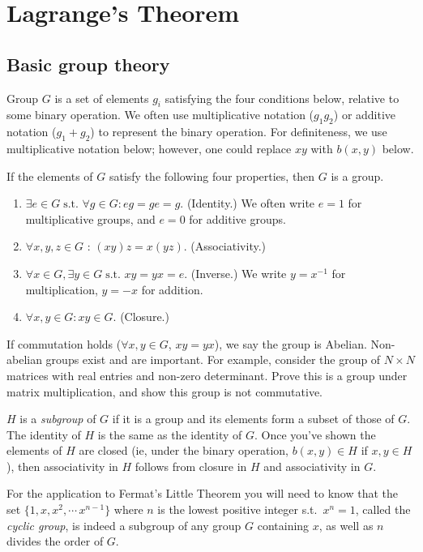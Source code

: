 \documentclass[12pt,letterpaper]{report}
\newcommand\st{\mbox{s.t.\ }}
\newcommand\ben{\begin{enumerate}}
\newcommand\een{\end{enumerate}}
\begin{document}
\section{Lagrange's Theorem}

\subsection{Basic group theory}

Group $G$ is a set of elements $g_i$ satisfying the four
conditions below, relative to some binary operation. We often use
multiplicative notation ($g_1 g_2$) or additive notation ($g_1 +
g_2$) to represent the binary operation. For definiteness, we use
multiplicative notation below; however, one could replace $xy$
with $b(x,y)$ below.

If the elements of $G$ satisfy the following four properties, then
$G$ is a group.

\ben
\item $\exists e \in G \;\st \forall g \in G : eg = ge = g$. (Identity.)
We often write $e=1$ for multiplicative groups, and $e = 0$ for
additive groups.

\item $\forall x,y,z \in G$ : $(xy)z = x(yz)$. (Associativity.)

\item $\forall x \in G, \exists y \in G \;\st xy = yx = e$. (Inverse.)
We write $y = x^{-1}$ for multiplication, $y = -x$ for addition.

\item $\forall x,y \in G : xy \in G$. (Closure.)
\een

If commutation holds ($\forall x, y \in G$, $xy = yx$), we say the
group is Abelian. Non-abelian groups exist and are important. For
example, consider the group of $N \times N$ matrices with real
entries and non-zero determinant. Prove this is a group under
matrix multiplication, and show this group is not commutative.

$H$ is a {\em subgroup} of $G$ if it is a group and its elements
form a subset of those of $G$. The identity of $H$ is the same as
the identity of $G$. Once you've shown the elements of $H$ are
closed (ie, under the binary operation, $b(x,y) \in H$ if $x, y
\in H$), then associativity in $H$ follows from closure in $H$ and
associativity in $G$.

For the application to Fermat's Little Theorem you will need to
know that the set $\{1,x,x^2,\cdots\,x^{n-1}\}$ where $n$ is the
lowest positive integer \st $x^n = 1$, called the {\em cyclic
group}, is indeed a subgroup of any group $G$ containing $x$, as
well as $n$ divides the order of $G$.
\end{document}
